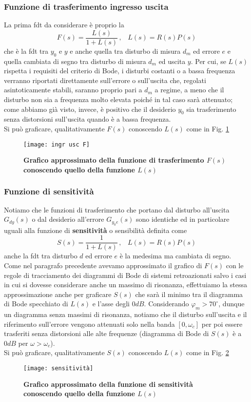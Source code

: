 \documentclass[a4paper]{article}
\begin{document}
	\subsubsection*{Funzione di trasferimento ingresso uscita}
	La prima fdt da considerare è proprio la \[F(s)=\dfrac{L(s)}{1+L(s)}\,,\,\,\,\,\,L(s)=R(s)P(s)\]
	che è la fdt tra $y_0$ e $y$ e anche quella tra disturbo di misura $d_m$ ed errore $e$ e quella cambiata di segno tra disturbo di misura $d_m$ ed uscita $y$.
	 Per cui, se $ L(s) $ rispetta i requisiti del criterio di Bode, i disturbi costanti o a bassa frequenza verranno riportati direttamente sull'errore o sull'uscita che, regolati asintoticamente stabili, saranno proprio pari a $ d_m $ a regime, a meno che il disturbo non sia a frequenza molto elevata poiché in tal caso sarà attenuato; come abbiamo già visto, invece, è positivo che il desiderio $ y_0 $ sia trasferimento senza distorsioni sull'uscita quando è a bassa frequenza.
	 \\Si può graficare, qualitativamente $ F(s) $ conoscendo $ L(s) $ come in Fig. \ref{fig:F(s)}
	 \begin{figure}[htbp]
	 	\centering
	 	\texttt{[image: ingr usc F]}
	 	\caption{\textbf{Grafico approssimato della funzione di trasferimento $ F(s) $ conoscendo quello della funzione $ L(s) $}}\label{fig:F(s)}
	 \end{figure}
	\subsubsection*{Funzione di sensitività}
	\label{sensitività}
	Notiamo che le funzioni di trasferimento che portano dal disturbo all'uscita $ G_{dy}(s) $ o dal desiderio all'errore $ G_{y_0e}(s) $ sono identiche ed in particolare uguali alla funzione di \textbf{sensitività} o sensibilità definita come \[S(s)=\dfrac{1}{1+L(s)}\,,\,\,\,\,\,L(s)=R(s)P(s)\]
	anche la fdt tra disturbo $ d $ ed errore $ e $ è la medesima ma cambiata di segno.\\
	Come nel paragrafo precedente avevamo approssimato il grafico di $F(s)$ con le regole di tracciamento dei diagrammi di Bode di sistemi retroazionati salvo i casi in cui si dovesse considerare anche un massimo di risonanza, effettuiamo la stessa approssimazione anche per graficare $ S(s) $  che sarà il minimo tra il diagramma di Bode specchiato di $ L(s) $ e l'asse degli $ 0dB $. Considerando $\varphi_m>70^{\circ}$, dunque un diagramma senza massimi di risonanza, notiamo che il disturbo sull'uscita e il riferimento sull'errore vengono attenuati solo nella banda $ [0,\omega_c] $ per poi essere trasferiti senza distorsioni alle alte frequenze (diagramma di Bode di $ S(s) $ è a $ 0dB $ per $ \omega>\omega_c $).
	\\Si può graficare, qualitativamente $ S(s) $ conoscendo $ L(s) $ come in Fig. \ref{fig:sensitiv}
	\begin{figure}[htbp]
		\centering
		\texttt{[image: sensitività]}
		\caption{\textbf{Grafico approssimato della funzione di sensitività conoscendo quello della funzione $ L(s) $}}\label{fig:sensitiv}
	\end{figure}
\end{document}
